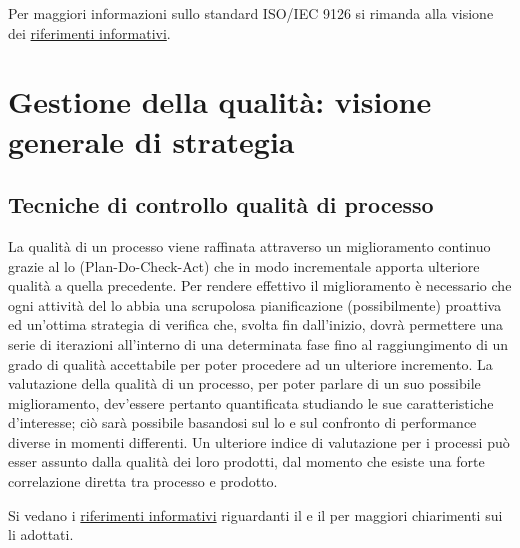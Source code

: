 \documentclass[a4paper, titlepage]{article}
\begin{document}
Per maggiori informazioni sullo standard ISO/IEC 9126 si rimanda alla visione dei \hyperref[rifinfo] {riferimenti informativi}.

\section{Gestione della qualità: visione generale di strategia}

\subsection{Tecniche di controllo qualità di processo}
La qualità di un processo viene raffinata attraverso un miglioramento continuo grazie al lo  (Plan-Do-Check-Act) che in modo incrementale apporta ulteriore qualità a quella precedente. Per rendere effettivo il miglioramento è necessario che ogni attività del lo abbia una scrupolosa pianificazione (possibilmente) proattiva ed un'ottima strategia di verifica che, svolta fin dall'inizio, dovrà permettere una serie di iterazioni all'interno di una determinata fase fino al raggiungimento di un grado di qualità accettabile per poter procedere ad un ulteriore incremento.
\newline La valutazione della qualità di un processo, per poter parlare di un suo possibile miglioramento, dev'essere pertanto quantificata studiando le sue caratteristiche d'interesse; ciò sarà possibile basandosi sul lo  e sul confronto di performance diverse in momenti differenti.
\newline Un ulteriore indice di valutazione per i processi può esser assunto dalla qualità dei loro prodotti, dal momento che esiste una forte correlazione diretta tra processo e prodotto.

Si vedano i \hyperref[rifinfo]{riferimenti informativi} riguardanti il  e il  per maggiori chiarimenti sui li adottati.
\end{document}
